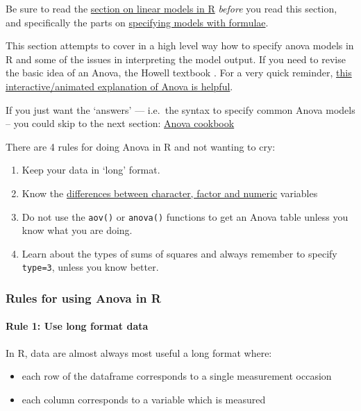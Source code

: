 \documentclass[]{article}
\providecommand{\tightlist}{%
  \setlength{\itemsep}{0pt}\setlength{\parskip}{0pt}}
\let\oldparagraph\paragraph
\renewcommand{\paragraph}[1]{\oldparagraph{#1}\mbox{}}
\theoremstyle{definition}
\theoremstyle{definition}
\theoremstyle{definition}
\theoremstyle{remark}
\begin{document}
{Be sure to read the \protect\hyperlink{linear-models-simple}{section on
linear models in R} \emph{before} you read this section, and
specifically the parts on \protect\hyperlink{formulae}{specifying models
with formulae}.}

This section attempts to cover in a high level way how to specify anova
models in R and some of the issues in interpreting the model output. If
you need to revise the basic idea of an Anova, the Howell textbook
\citep{howell2016fundamental}. For a very quick reminder,
\href{http://web.utah.edu/stat/introstats/anovaflash.html}{this
interactive/animated explanation of Anova is helpful}.

If you just want the `answers' --- i.e.~the syntax to specify common
Anova models -- you could skip to the next section:
\protect\hyperlink{anova-cookbook}{Anova cookbook}

There are 4 rules for doing Anova in R and not wanting to cry:

\begin{enumerate}
\def\labelenumi{\arabic{enumi}.}
\tightlist
\item
  Keep your data in `long' format.
\item
  Know the \protect\hyperlink{factors-and-numerics}{differences between
  character, factor and numeric} variables
\item
  Do not use the \texttt{aov()} or \texttt{anova()} functions to get an
  Anova table unless you know what you are doing.
\item
  Learn about the types of sums of squares and always remember to
  specify \texttt{type=3}, unless you know better.
\end{enumerate}

\subsubsection*{Rules for using Anova in
R}\label{rules-for-using-anova-in-r}

\paragraph{Rule 1: Use long format
data}\label{rule-1-use-long-format-data}

In R, data are almost always most useful a long format where:

\begin{itemize}
\tightlist
\item
  each row of the dataframe corresponds to a single measurement occasion
\item
  each column corresponds to a variable which is measured
\end{itemize}
\end{document}
